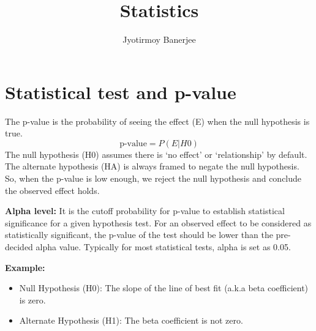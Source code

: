\documentclass{article}
\title{Statistics}
\author{Jyotirmoy Banerjee}
\begin{document}
\maketitle

\section{Statistical test and p-value}
The p-value is the probability of seeing the effect (E) when the null hypothesis is true.
\[
\text{p-value} = P(E|H0)
\]
The null hypothesis (H0) assumes there is `no effect' or `relationship' by default. The alternate hypothesis (HA) is always framed to negate the null hypothesis. So, when the p-value is low enough, we reject the null hypothesis and conclude the observed effect holds.

\textbf{Alpha level:}
It is the cutoff probability for p-value to establish statistical significance for a given hypothesis test.
For an observed effect to be considered as statistically significant, the p-value of the test should be lower than the pre-decided alpha value.
Typically for most statistical tests, alpha is set as 0.05.

\textbf{Example:}
\begin{itemize}
\item Null Hypothesis (H0): The slope of the line of best fit (a.k.a beta coefficient) is zero.
\item Alternate Hypothesis (H1): The beta coefficient is not zero.
\end{itemize}
\end{document}
